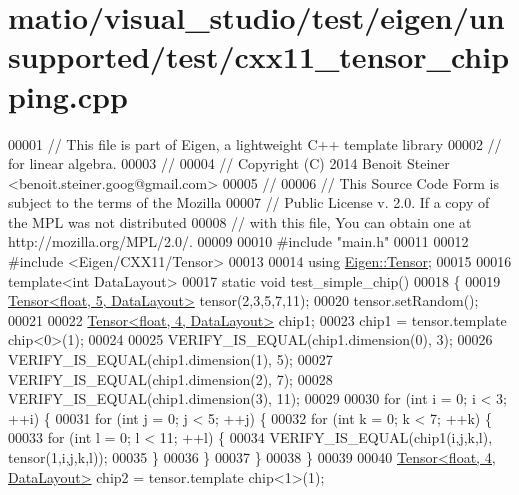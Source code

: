 \hypertarget{matio_2visual__studio_2test_2eigen_2unsupported_2test_2cxx11__tensor__chipping_8cpp_source}{}\section{matio/visual\+\_\+studio/test/eigen/unsupported/test/cxx11\+\_\+tensor\+\_\+chipping.cpp}
\label{matio_2visual__studio_2test_2eigen_2unsupported_2test_2cxx11__tensor__chipping_8cpp_source}

\begin{DoxyCode}
00001 \textcolor{comment}{// This file is part of Eigen, a lightweight C++ template library}
00002 \textcolor{comment}{// for linear algebra.}
00003 \textcolor{comment}{//}
00004 \textcolor{comment}{// Copyright (C) 2014 Benoit Steiner <benoit.steiner.goog@gmail.com>}
00005 \textcolor{comment}{//}
00006 \textcolor{comment}{// This Source Code Form is subject to the terms of the Mozilla}
00007 \textcolor{comment}{// Public License v. 2.0. If a copy of the MPL was not distributed}
00008 \textcolor{comment}{// with this file, You can obtain one at http://mozilla.org/MPL/2.0/.}
00009 
00010 \textcolor{preprocessor}{#include "main.h"}
00011 
00012 \textcolor{preprocessor}{#include <Eigen/CXX11/Tensor>}
00013 
00014 \textcolor{keyword}{using} \hyperlink{class_eigen_1_1_tensor}{Eigen::Tensor};
00015 
00016 \textcolor{keyword}{template}<\textcolor{keywordtype}{int} DataLayout>
00017 \textcolor{keyword}{static} \textcolor{keywordtype}{void} test\_simple\_chip()
00018 \{
00019   \hyperlink{class_eigen_1_1_tensor}{Tensor<float, 5, DataLayout>} tensor(2,3,5,7,11);
00020   tensor.setRandom();
00021 
00022   \hyperlink{class_eigen_1_1_tensor}{Tensor<float, 4, DataLayout>} chip1;
00023   chip1 = tensor.template chip<0>(1);
00024 
00025   VERIFY\_IS\_EQUAL(chip1.dimension(0), 3);
00026   VERIFY\_IS\_EQUAL(chip1.dimension(1), 5);
00027   VERIFY\_IS\_EQUAL(chip1.dimension(2), 7);
00028   VERIFY\_IS\_EQUAL(chip1.dimension(3), 11);
00029 
00030   \textcolor{keywordflow}{for} (\textcolor{keywordtype}{int} i = 0; i < 3; ++i) \{
00031     \textcolor{keywordflow}{for} (\textcolor{keywordtype}{int} j = 0; j < 5; ++j) \{
00032       \textcolor{keywordflow}{for} (\textcolor{keywordtype}{int} k = 0; k < 7; ++k) \{
00033         \textcolor{keywordflow}{for} (\textcolor{keywordtype}{int} l = 0; l < 11; ++l) \{
00034           VERIFY\_IS\_EQUAL(chip1(i,j,k,l), tensor(1,i,j,k,l));
00035         \}
00036       \}
00037     \}
00038   \}
00039 
00040   \hyperlink{class_eigen_1_1_tensor}{Tensor<float, 4, DataLayout>} chip2 = tensor.template chip<1>(1);

\end{DoxyCode}
